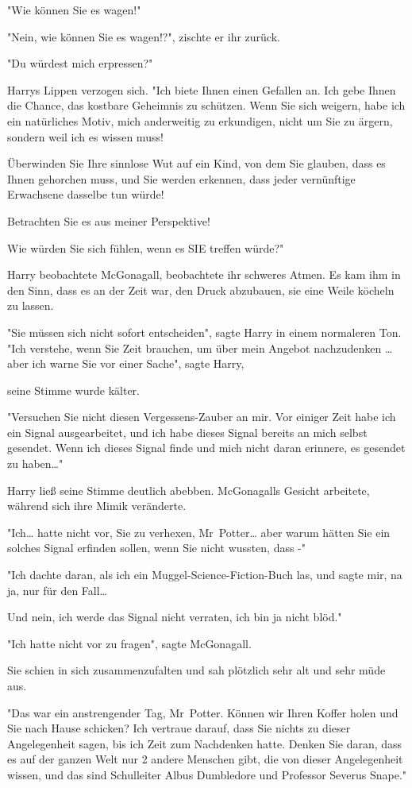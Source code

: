 {"Wie können Sie es wagen!"

"Nein, wie können Sie es wagen!?", zischte er ihr zurück.

"Du würdest mich erpressen?"

Harrys Lippen verzogen sich. "Ich biete Ihnen einen Gefallen an. Ich gebe Ihnen die Chance, das kostbare Geheimnis zu schützen. Wenn Sie sich weigern, habe ich ein natürliches Motiv, mich anderweitig zu erkundigen, nicht um Sie zu ärgern, sondern weil ich es wissen muss!

Überwinden Sie Ihre sinnlose Wut auf ein Kind, von dem Sie glauben, dass es Ihnen gehorchen muss, und Sie werden erkennen, dass jeder vernünftige Erwachsene dasselbe tun würde!

Betrachten Sie es aus meiner Perspektive!

Wie würden Sie sich fühlen, wenn es SIE treffen würde?"

Harry beobachtete McGonagall, beobachtete ihr schweres Atmen. Es kam ihm in den Sinn, dass es an der Zeit war, den Druck abzubauen, sie eine Weile köcheln zu lassen.

"Sie müssen sich nicht sofort entscheiden", sagte Harry in einem normaleren Ton. "Ich verstehe, wenn Sie Zeit brauchen, um über mein Angebot nachzudenken … aber ich warne Sie vor einer Sache", sagte Harry,

seine Stimme wurde kälter.

"Versuchen Sie nicht diesen Vergessens-Zauber an mir. Vor einiger Zeit habe ich ein Signal ausgearbeitet, und ich habe dieses Signal bereits an mich selbst gesendet. Wenn ich dieses Signal finde und mich nicht daran erinnere, es gesendet zu haben…"

Harry ließ seine Stimme deutlich abebben. McGonagalls Gesicht arbeitete, während sich ihre Mimik veränderte.

"Ich… hatte nicht vor, Sie zu verhexen, Mr~Potter… aber warum hätten Sie ein solches Signal erfinden sollen, wenn Sie nicht wussten, dass -"

"Ich dachte daran, als ich ein Muggel-Science-Fiction-Buch las, und sagte mir, na ja, nur für den Fall…

Und nein, ich werde das Signal nicht verraten, ich bin ja nicht blöd."

"Ich hatte nicht vor zu fragen", sagte McGonagall.

Sie schien in sich zusammenzufalten und sah plötzlich sehr alt und sehr müde aus.

"Das war ein anstrengender Tag, Mr~Potter. Können wir Ihren Koffer holen und Sie nach Hause schicken? Ich vertraue darauf, dass Sie nichts zu dieser Angelegenheit sagen, bis ich Zeit zum Nachdenken hatte. Denken Sie daran, dass es auf der ganzen Welt nur 2 andere Menschen gibt, die von dieser Angelegenheit wissen, und das sind Schulleiter Albus Dumbledore und Professor Severus Snape."

}
